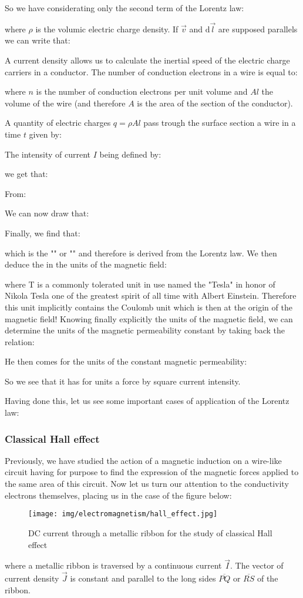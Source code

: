 	So we have considerating only the second term of the Lorentz law:
	
	where $\rho$ is the volumic electric charge density. If $\vec{v}$ and $\mathrm{d}\vec{l}$ are supposed parallels we can write that:
	
	A current density allows us to calculate the inertial speed of the electric charge carriers in a conductor. The number of conduction electrons in a wire is equal to:
	
	where $n$ is the number of conduction electrons per unit volume and $Al$ the volume of the wire (and therefore $A$ is the area of the section of the conductor).
	
	A quantity of electric charges $q=\rho A l$ pass trough the surface section a wire in a time $t$ given by:
	
	The intensity of current $I$ being defined by:
	
	we get that:
	
	From:
	
	We can now draw that:
	
	Finally, we find that:
	
	which is the "" or "" and therefore is derived from the Lorentz law. We then deduce the in the units of the magnetic field:
	
	where T is a commonly tolerated unit in use named the "Tesla" in honor of Nikola Tesla one of the greatest spirit of all time with Albert Einstein. Therefore this unit implicitly contains the Coulomb unit which is then at the origin of the magnetic field! Knowing finally explicitly the units of the magnetic field, we can determine the units of the magnetic permeability constant by taking back the relation:
	
	He then comes for the units of the constant magnetic permeability:
	
	So we see that it has for units a force by square current intensity.

	Having done this, let us see some important cases of application of the Lorentz law:
	
	\pagebreak
	\subsubsection{Classical Hall effect}
	Previously, we have studied the action of a magnetic induction on a wire-like circuit having for purpose to find the expression of the magnetic forces applied to the same area of this circuit. Now let us turn our attention to the conductivity electrons themselves, placing us in the case of the figure below:
	\begin{figure}[H]
		\centering
		\texttt{[image: img/electromagnetism/hall\_effect.jpg]}
		\caption{DC current through a metallic ribbon for the study of classical Hall effect}
	\end{figure}
	where a metallic ribbon is traversed by a continuous current $\vec{I}$. The vector of current density $\vec{J}$ is constant and parallel to the long sides $\overline{PQ}$ or $\overline{RS}$ of the ribbon.
	
